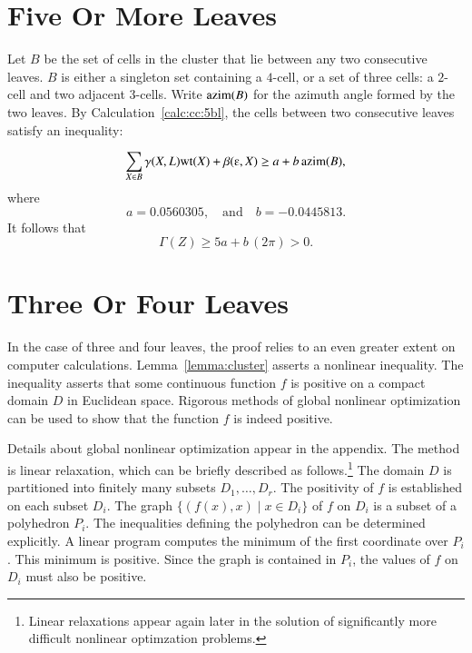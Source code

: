 \section{Five Or More Leaves}

Let $B$ be the set of cells in the cluster that lie between any two
consecutive leaves.  $B$ is either a singleton set containing a
$4$-cell, or a set of three cells: a $2$-cell and two adjacent
$3$-cells.  Write ${\operatorname{azim}}(B)$ for the azimuth angle formed by the
two leaves.  By Calculation~\ref{calc:cc:5bl}, the cells between two
consecutive leaves satisfy an
inequality: %

\begin{displaymath} 
\sum_{X\in B} \gamma(X,L)\op{wt}(X) + \beta(\ee,X) \ge a + b\,\op{azim}(B),
\end{displaymath}
where
\begin{displaymath} 
a= 0.0560305, \quad\text{and}\quad  b= -0.0445813.
\end{displaymath}
It follows that
\begin{displaymath} 
\Gamma(Z) \ge 5 a + b\, (2\pi) > 0.
\end{displaymath}

\section{Three Or Four Leaves}\label{sec:3or4}

In the case of three and four leaves, the proof relies to an even
greater extent on computer calculations.  
Lemma~\ref{lemma:cluster} asserts a nonlinear inequality.  The inequality
asserts that some continuous function $f$ is positive on a compact
domain $D$ in Euclidean space.  Rigorous methods of global nonlinear
optimization can be used to show that the function $f$ is indeed
positive.

Details about global nonlinear optimization appear in the appendix.
The method is linear relaxation, which can be briefly described as
follows.\footnote{Linear relaxations appear again later in the
solution of significantly more difficult nonlinear optimzation
problems.}  The domain $D$ is partitioned into finitely many subsets
$D_1,\ldots, D_r$.  The positivity of $f$ is established on each
subset $D_i$.  The graph $\{(f(x), x)\mid x\in D_i\}$ of $f$ on $D_i$
is a subset of a polyhedron $P_i$.  The inequalities defining the
polyhedron can be determined explicitly.  A linear program computes
the minimum of the first coordinate over $P_i$.  This minimum is
positive.  Since the graph is contained in $P_i$, the values of $f$ on
$D_i$ must also be positive.

